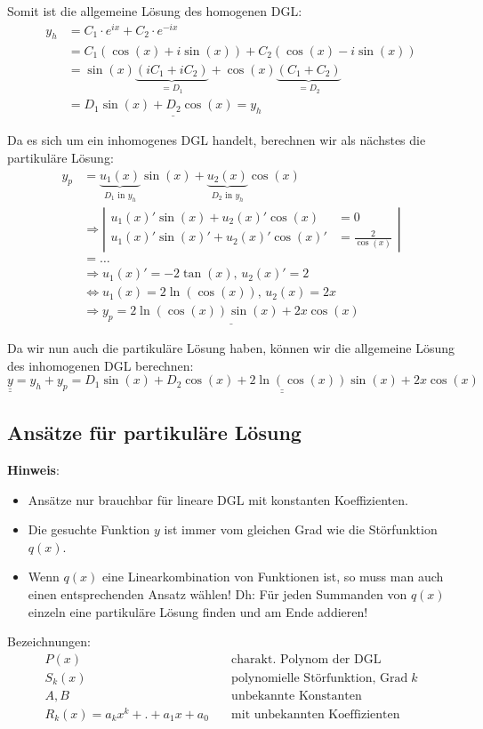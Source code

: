 Somit ist die allgemeine Lösung des homogenen DGL:
\begin{align*}
y_h &= C_1 \cdot e^{ix} + C_2 \cdot e^{-ix}\\
&= C_1 (\cos(x) + i\sin(x)) + C_2(\cos(x) - i\sin(x))\\
&= \sin(x) \underbrace{(i C_1 + i C_2)}_{ = D_1} + \cos(x) \underbrace{(C_1 + C_2)}_{= D_2}\\
&= \underline{D_1 \sin(x) + D_2 \cos(x) = y_h}
\end{align*}

Da es sich um ein inhomogenes DGL handelt, berechnen wir als nächstes die partikuläre
Lösung:
\begin{align*}
y_p &= \underbrace{u_1(x)}_{D_1 \text{ in } y_h} \sin(x) + \underbrace{u_2(x)}_{D_2 \text{ in } y_h} \cos(x)\\
&\Rightarrow \left|
	\begin{aligned}
		u_1(x)' \sin(x) + u_2(x)' \cos(x) &= 0\\
		u_1(x)' \sin(x)' + u_2(x)' \cos(x)' &= \frac{2}{\cos(x)}
	\end{aligned}
\right|\\
&= \ldots\\
&\Rightarrow u_1(x)' = -2 \tan(x),\, u_2(x)' = 2\\
&\Leftrightarrow u_1(x) = 2 \ln(\cos(x)),\, u_2(x) = 2x\\
&\Rightarrow \underline{y_p = 2 \ln(\cos(x)) \sin(x) + 2x \cos(x)}
\end{align*}

Da wir nun auch die partikuläre Lösung haben, können wir die allgemeine Lösung
des inhomogenen DGL berechnen:
$\underline{\underline{y}} = y_h + y_p = \underline{\underline{D_1 \sin(x) + D_2 \cos(x) + 2 \ln(\cos(x)) \sin(x) + 2x \cos(x)}}$

\subsection{Ansätze für partikuläre Lösung}
\label{sec:ansatz-dgl}
	\textbf{Hinweis}:
	\begin{itemize}
		\item Ansätze nur brauchbar für lineare DGL mit konstanten Koeffizienten.

		\item Die gesuchte Funktion $y$ ist immer vom gleichen Grad wie die Störfunktion $q(x)$.

		\item Wenn $q(x)$ eine Linearkombination von Funktionen ist, so muss man auch einen entsprechenden Ansatz wählen! Dh: Für jeden Summanden von $q(x)$ einzeln eine partikuläre Lösung finden und am Ende addieren!
	\end{itemize}
	Bezeichnungen:
	\begin{align*}
	P(x)  &  \quad \text{charakt. Polynom der DGL}  \\
	S_k(x) & \quad \text{polynomielle Störfunktion, Grad} \; k \\
	A, B & \quad \text{unbekannte Konstanten} \\
	R_k(x) = a_k x^k + . + a_1 x + a_0 & \quad \text{mit unbekannten Koeffizienten}
	\end{align*}
	
